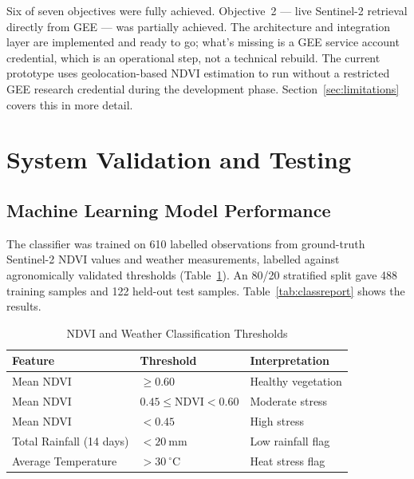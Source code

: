 \documentclass[12pt,a4paper]{report}
\begin{document}
Six of seven objectives were fully achieved. Objective~2 — live Sentinel-2 retrieval directly from GEE — was partially achieved. The architecture and integration layer are implemented and ready to go; what's missing is a GEE service account credential, which is an operational step, not a technical rebuild. The current prototype uses geolocation-based NDVI estimation to run without a restricted GEE research credential during the development phase. Section~\ref{sec:limitations} covers this in more detail.

\section{System Validation and Testing}

\subsection{Machine Learning Model Performance}

The classifier was trained on 610 labelled observations from ground-truth Sentinel-2 NDVI values and weather measurements, labelled against agronomically validated thresholds (Table~\ref{tab:thresholds}). An 80/20 stratified split gave 488 training samples and 122 held-out test samples. Table~\ref{tab:classreport} shows the results.

\begin{table}[H]
  \centering
  \caption{NDVI and Weather Classification Thresholds}
  \label{tab:thresholds}
  \begin{tabularx}{\textwidth}{X l l}
    \toprule
    \textbf{Feature} & \textbf{Threshold} & \textbf{Interpretation} \\
    \midrule
    Mean NDVI & $\geq 0.60$ & Healthy vegetation \\
    Mean NDVI & $0.45 \leq \text{NDVI} < 0.60$ & Moderate stress \\
    Mean NDVI & $< 0.45$ & High stress \\
    Total Rainfall (14 days) & $< 20\ \text{mm}$ & Low rainfall flag \\
    Average Temperature & $> 30\ ^{\circ}\text{C}$ & Heat stress flag \\
    \bottomrule
  \end{tabularx}
\end{table}
\end{document}
